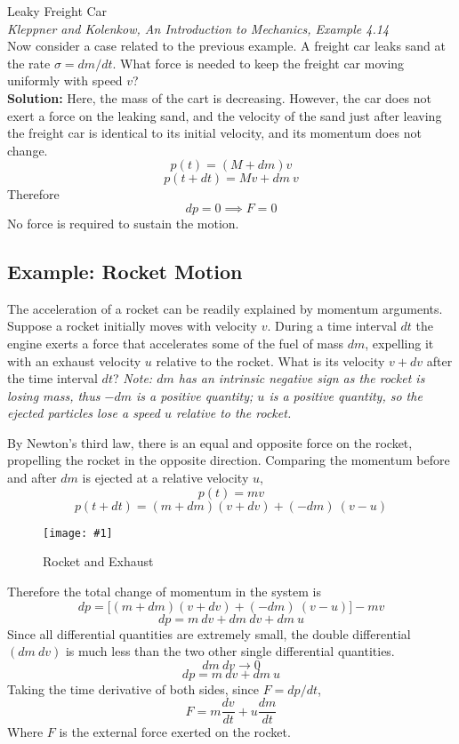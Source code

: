 \documentclass[11pt]{article}
\newcommand{\fig}[4]{
    \begin{figure}[H]
        \centering
        \texttt{[image: \#1]}
        \caption{#2}
        \label{exp4fit}
    \end{figure}
}
\theoremstyle{gangnamstyle}{\newtheorem{definition}{Definition}[]}
\theoremstyle{gangnamstyle}{\newtheorem{example}{Example}[]}
\theoremstyle{gangnamstyle}{\newtheorem{problem}{Problem}[]}
\theoremstyle{gangnamstyle}{\newtheorem{warning}{Warning}[]}
\begin{document}
\begin{example}
Leaky Freight Car \\
\textit{Kleppner and Kolenkow, An Introduction to Mechanics, Example 4.14} \\
Now consider a case related to the previous example. A freight car leaks sand at the rate $\sigma = dm/dt$. What force is needed to keep the freight car moving uniformly with speed $v$? \\

\textbf{Solution:} Here, the mass of the cart is decreasing. However, the car does not exert a force on the leaking sand, and the velocity of the sand just after leaving the freight car is identical to its initial velocity, and its momentum does not change. 
\[ p(t) = (M + dm)v \]
\[ p(t + dt) = Mv + dm \ v \]
Therefore
\[ dp = 0 \implies F = 0 \]
No force is required to sustain the motion. 
\end{example}

\subsection{Example: Rocket Motion}

The acceleration of a rocket can be readily explained by momentum arguments. Suppose a rocket initially moves with velocity $v$. During a time interval $dt$ the engine exerts a force that accelerates some of the fuel of mass $dm$, expelling it with an exhaust velocity $u$ relative to the rocket. What is its velocity $v + dv$ after the time interval $dt$? 
\textit{Note: $dm$ has an intrinsic negative sign as the rocket is losing mass, thus $-dm$ is a positive quantity; $u$ is a positive quantity, so the ejected particles lose a speed $u$ relative to the rocket.} 

By Newton’s third law, there is an equal and opposite force on the rocket, propelling the rocket in the opposite direction. Comparing the momentum before and after $dm$ is ejected at a relative velocity $u$, 
\[ p(t) = mv \]
\[ p(t + dt) = (m + dm)(v + dv) + (-dm) \ (v - u) \]
\fig{figs/n4/rocket.png}{Rocket and Exhaust}{0.35}{0}
Therefore the total change of momentum in the system is
\[ dp = \big[ (m + dm)(v + dv) + (-dm) \ (v - u) \big] - mv \]
\[ dp = m \ dv + dm \ dv + dm \ u \]
Since all differential quantities are extremely small, the double differential $(dm \ dv)$ is much less than the two other single differential quantities. 
\[ dm \ dv \rightarrow 0 \]
\[ dp = m \ dv + dm \ u \]
Taking the time derivative of both sides, since $F = dp / dt$, 
\[ F = m\frac{dv}{dt} + u\frac{dm}{dt} \]
Where $F$ is the external force exerted on the rocket. \\
\end{document}
